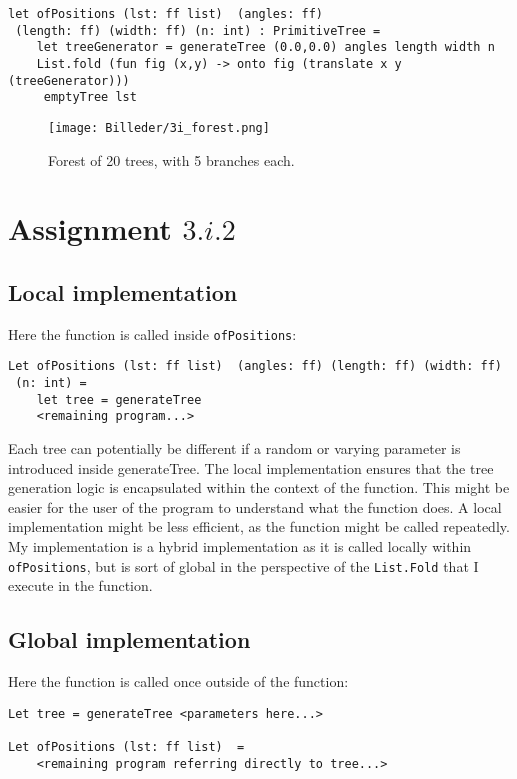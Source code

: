 \documentclass[a4paper]{article}
\begin{document}
\begin{lstlisting}
let ofPositions (lst: ff list)  (angles: ff)
 (length: ff) (width: ff) (n: int) : PrimitiveTree =
    let treeGenerator = generateTree (0.0,0.0) angles length width n
    List.fold (fun fig (x,y) -> onto fig (translate x y (treeGenerator)))
     emptyTree lst

\end{lstlisting}

\begin{figure}[h!]
  \texttt{[image: Billeder/3i\_forest.png]}
  \caption{Forest of 20 trees, with 5 branches each.}
  \label{fig: Forest}
\end{figure}

\section*{Assignment $3.i.2$}

\subsection*{Local implementation}

Here the function is called inside \verb|ofPositions|:

\begin{lstlisting}
Let ofPositions (lst: ff list)  (angles: ff) (length: ff) (width: ff)
 (n: int) =
    let tree = generateTree
    <remaining program...>
\end{lstlisting}

\noindent
Each tree can potentially be different if a random or varying parameter is introduced inside generateTree. The local implementation ensures that the tree generation logic is encapsulated within the context of the function. This might be easier for the user of the program to understand what the function does. A local implementation might be less efficient, as the function might be called repeatedly. My implementation is a hybrid implementation as it is called locally within \verb|ofPositions|, but is sort of global in the perspective of the \verb|List.Fold| that I execute in the function. 

\subsection*{Global implementation}

Here the function is called once outside of the function:

\begin{lstlisting}
Let tree = generateTree <parameters here...>

Let ofPositions (lst: ff list)  =
    <remaining program referring directly to tree...>
\end{lstlisting}
\end{document}
